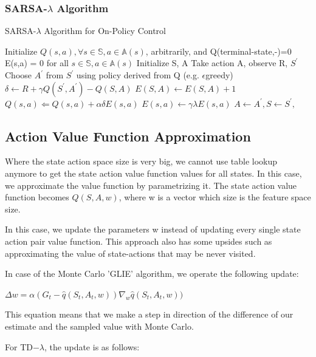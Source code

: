 \documentclass[12pt,a4paper]{article}
\begin{document}
\subsubsection{SARSA-$\lambda$ Algorithm}

\begin{algorithm}
\caption{SARSA-$\lambda$ Algorithm for On-Policy Control}
\label{alg:sarsa_lambda}
\begin{algorithmic}[1]
\State Initialize $Q(s,a),\forall s \in \mathbb{S}, a \in \mathbb{A}(s)$, arbitrarily, and Q(terminal-state,-)=0
\State E(s,a) = 0 for all $s\in\mathbb{S}, a\in\mathbb{A}(s)$
\State Initialize S, A
\State Take action A, observe R, $S^{\prime}$
\State Choose $A^{\prime}$ from $S^{\prime}$ using policy derived from Q (e.g. $\epsilon$greedy)
\State $\delta \leftarrow R + \gamma Q(S^{\prime},A^{\prime}) - Q(S,A) $
\State $E(S,A) \leftarrow E(S,A) + 1$ 
\State $Q(s,a) \Leftarrow Q(s,a) + \alpha\delta E(s,a)$
\State $E(s,a) \leftarrow \gamma \lambda E(s,a)$
\EndFor
\State $A \leftarrow A^{\prime}, S \leftarrow S^{\prime},$
\EndFor
\EndFor
\end{algorithmic}
\end{algorithm}


\subsection{Action Value Function Approximation}
Where the state action space size is very big, we cannot use table lookup anymore to get the state action value function values for all states. In this case, we approximate the value function by parametrizing it.
The state action value function becomes $Q(S, A, w)$, where w is a vector which size is the feature space size.

In this case, we update the parameters w instead of updating every single state action pair value function. This approach also has some upsides such as approximating the value of state-actions that may be never visited.

In case of the Monte Carlo 'GLIE' algorithm, we operate the following update:

$\Delta w=\alpha (G_{t} - \hat{q}(S_{t}, A_{t}, w) )\nabla_{w}\hat{q}(S_{t}, A_{t}, w) )$ 

This equation means that we make a step in direction of the difference of our estimate and the sampled value with Monte Carlo.

For TD$-\lambda$, the update is as follows:
\end{document}

